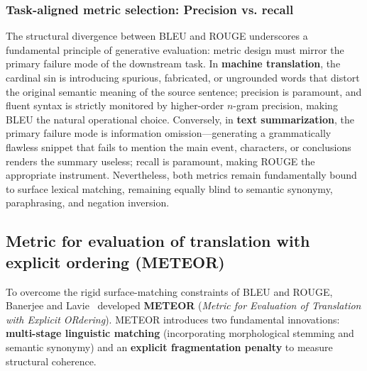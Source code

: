 \documentclass[../../../main.tex]{subfiles}
\begin{document}
\subsubsection{Task-aligned metric selection: Precision vs. recall}
The structural divergence between BLEU and ROUGE underscores a fundamental principle of generative evaluation: metric design must mirror the primary failure mode of the downstream task. In \textbf{machine translation}, the cardinal sin is introducing spurious, fabricated, or ungrounded words that distort the original semantic meaning of the source sentence; precision is paramount, and fluent syntax is strictly monitored by higher-order $n$-gram precision, making BLEU the natural operational choice. Conversely, in \textbf{text summarization}, the primary failure mode is information omission---generating a grammatically flawless snippet that fails to mention the main event, characters, or conclusions renders the summary useless; recall is paramount, making ROUGE the appropriate instrument. Nevertheless, both metrics remain fundamentally bound to surface lexical matching, remaining equally blind to semantic synonymy, paraphrasing, and negation inversion.

\subsection{Metric for evaluation of translation with explicit ordering (METEOR)}
\label{subsec:meteor}

To overcome the rigid surface-matching constraints of BLEU and ROUGE, Banerjee and Lavie~\cite{banerjee2005meteor} developed \textbf{METEOR} (\textit{Metric for Evaluation of Translation with Explicit ORdering}). METEOR introduces two fundamental innovations: \textbf{multi-stage linguistic matching} (incorporating morphological stemming and semantic synonymy) and an \textbf{explicit fragmentation penalty} to measure structural coherence.
\end{document}
